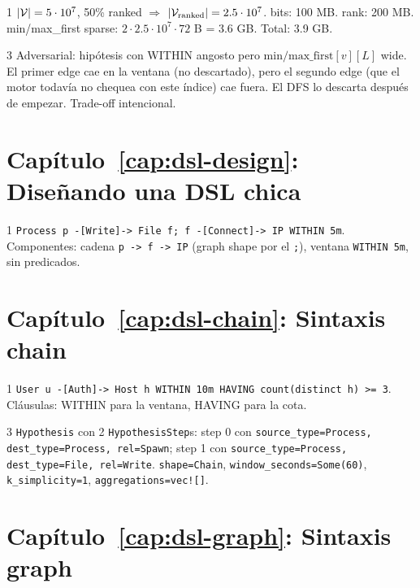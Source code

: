 \begin{solucion}{1}
\(|\mathcal{V}| = 5 \cdot 10^7\), 50\% ranked $\Rightarrow$
\(|\mathcal{V}_{\text{ranked}}| = 2.5 \cdot 10^7\). bits: 100 MB. rank:
200 MB. min/max\_first sparse: \(2 \cdot 2.5 \cdot 10^7 \cdot 72\)
B = 3.6 GB. Total: 3.9 GB.
\end{solucion}

\begin{solucion}{3}
Adversarial: hipótesis con WITHIN angosto pero
\(\mathrm{min/max\_first}[v][L]\) wide. El primer edge cae en la
ventana (no descartado), pero el segundo edge (que el motor
todavía no chequea con este índice) cae fuera. El DFS lo
descarta después de empezar. Trade-off intencional.
\end{solucion}

\section*{Capítulo~\ref{cap:dsl-design}: Diseñando una DSL chica}

\begin{solucion}{1}
\texttt{Process p -[Write]-> File f; f -[Connect]-> IP WITHIN 5m}.
Componentes: cadena \texttt{p -> f -> IP} (graph shape por el
\texttt{;}), ventana \texttt{WITHIN 5m}, sin predicados.
\end{solucion}

\section*{Capítulo~\ref{cap:dsl-chain}: Sintaxis chain}

\begin{solucion}{1}
\texttt{User u -[Auth]-> Host h WITHIN 10m HAVING count(distinct h) >= 3}.
Cláusulas: WITHIN para la ventana, HAVING para la cota.
\end{solucion}

\begin{solucion}{3}
\texttt{Hypothesis} con 2 \texttt{HypothesisStep}s: step 0 con
\texttt{source\_type=Process, dest\_type=Process, rel=Spawn}; step
1 con \texttt{source\_type=Process, dest\_type=File, rel=Write}.
\texttt{shape=Chain}, \texttt{window\_seconds=Some(60)},
\texttt{k\_simplicity=1}, \texttt{aggregations=vec![]}.
\end{solucion}

\section*{Capítulo~\ref{cap:dsl-graph}: Sintaxis graph}

